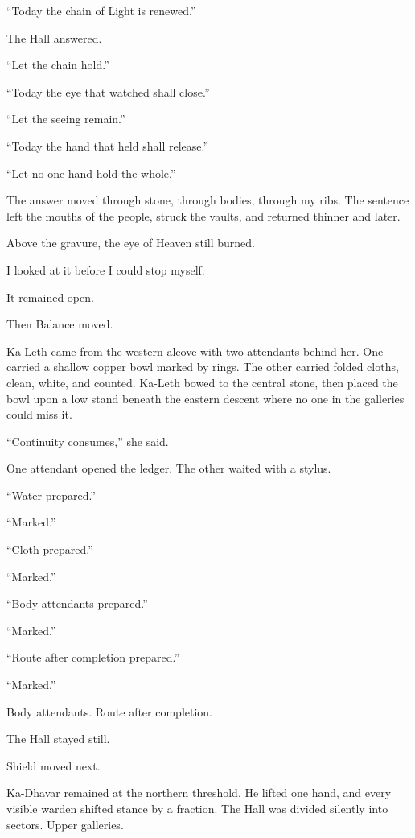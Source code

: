 ``Today the chain of Light is renewed.''\par
The Hall answered.\par
``Let the chain hold.''\par
``Today the eye that watched shall close.''\par
``Let the seeing remain.''\par
``Today the hand that held shall release.''\par
``Let no one hand hold the whole.''\par
The answer moved through stone, through bodies, through my ribs.
The sentence left the mouths of the people, struck the vaults, and returned thinner and later.\par
Above the gravure, the eye of Heaven still burned.\par
I looked at it before I could stop myself.\par
It remained open.\par
Then Balance moved.\par
Ka-Leth came from the western alcove with two attendants behind her.
One carried a shallow copper bowl marked by rings.
The other carried folded cloths, clean, white, and counted.
Ka-Leth bowed to the central stone, then placed the bowl upon a low stand beneath the eastern descent where no one in the galleries could miss it.\par
``Continuity consumes,'' she said.\par
One attendant opened the ledger.
The other waited with a stylus.\par
``Water prepared.''\par
``Marked.''\par
``Cloth prepared.''\par
``Marked.''\par
``Body attendants prepared.''\par
``Marked.''\par
``Route after completion prepared.''\par
``Marked.''\par
Body attendants.
Route after completion.\par
The Hall stayed still.\par
Shield moved next.\par
Ka-Dhavar remained at the northern threshold.
He lifted one hand, and every visible warden shifted stance by a fraction.
The Hall was divided silently into sectors.
Upper galleries.
